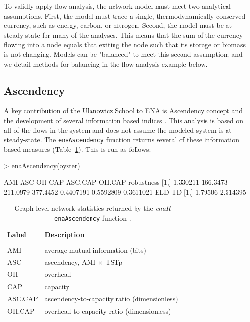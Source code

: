 \documentclass[article]{jss}
\begin{document}
To validly apply flow analysis, the network model must meet two
analytical assumptions.  First, the model must trace a single,
thermodynamically conserved currency, such as energy, carbon, or
nitrogen.  Second, the model must be at steady-state for many of the
analyses.  This means that the sum of the currency flowing into a node
equals that exiting the node such that its storage or biomass is not
changing.  Models can be "balanced" to meet this second assumption;
and we detail methods for balancing in the flow analysis example
below.


\subsection{Ascendency}

A key contribution of the Ulanowicz School to ENA is Ascendency
concept and the development of several information based indices
\citep{ulanowicz86, ulanowicz97}.  This analysis is based on all of
the flows in the system and does not assume the modeled system is at
steady-state.  The \texttt{enaAscendency} function returns several of
these information based measures (Table~\ref{tab:asc}).  This is run
as follows:

\begin{Schunk}
\begin{Sinput}
>   enaAscendency(oyster)
\end{Sinput}
\begin{Soutput}
          AMI      ASC       OH      CAP   ASC.CAP    OH.CAP robustness
[1,] 1.330211 166.3473 211.0979 377.4452 0.4407191 0.5592809  0.3611021
         ELD       TD
[1,] 1.79506 2.514395
\end{Soutput}
\end{Schunk}

\begin{table}[t]
  \caption{Graph-level network statistics returned by the \textit{enaR}
    \texttt{enaAscendency} function \citep[see][for
    interpretations]{ulanowicz86, ulanowicz97}.}\label{tab:asc}
  \center
  \begin{small}
    \begin{tabular}{l l}
      \textbf{Label} & \textbf{Description} \\ \hline \\[-1.5ex]
      AMI & average mutual information (bits) \\
      ASC & ascendency, AMI $\times$ TSTp \\
      OH & overhead \\
      CAP& capacity \\
      ASC.CAP& ascendency-to-capacity ratio (dimensionless)\\
      OH.CAP& overhead-to-capacity ratio (dimensionless)\\
      \hline
    \end{tabular}
  \end{small}
\end{table}
\end{document}
